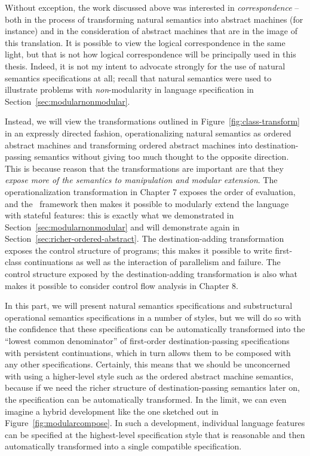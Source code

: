 Without exception, the work discussed above was interested in {\it
  correspondence} -- both in the process of transforming natural
semantics into abstract machines (for instance) and in the
consideration of abstract machines that are in the image of this
translation. It is possible to view the logical correspondence in the
same light, but that is not how logical correspondence will be
principally used in this thesis.  Indeed, it is not my intent to
advocate strongly for the use of natural semantics specifications at
all; recall that natural semantics were used to illustrate problems
with {\it non}-modularity in language specification in
Section~\ref{sec:modularnonmodular}. 

Instead, we will view the transformations outlined in
Figure~\ref{fig:class-transform} in an expressly directed fashion,
operationalizing natural semantics as ordered abstract machines and
transforming ordered abstract machines into destination-passing
semantics without giving too much thought to the opposite
direction. This is because reason that the transformations are
important are that they {\it expose more of the semantics to
  manipulation and modular extension}.  The operationalization
transformation in Chapter 7 exposes the order of evaluation, and the
\sls~framework then makes it possible to modularly extend the language
with stateful features: this is exactly what we demonstrated in
Section~\ref{sec:modularnonmodular} and will demonstrate again in
Section~\ref{sec:richer-ordered-abstract}.  The destination-adding
transformation exposes the control structure of programs; this makes
it possible to write first-class continuations as well as the
interaction of parallelism and failure.  The control structure exposed
by the destination-adding transformation is also what makes it
possible to consider control flow analysis in Chapter 8.

In this part, we will present natural semantics specifications and
substructural operational semantics specifications in a number of
styles, but we will do so with the confidence that these
specifications can be automatically transformed into the ``lowest
common denominator'' of first-order destination-passing specifications
with persistent continuations, which in turn allows them to be
composed with any other specifications. Certainly, this means that we
should be unconcerned with using a higher-level style such as the
ordered abstract machine semantics, because if we need the richer
structure of destination-passing semantics later on, the specification
can be automatically transformed. In the limit, we can even imagine a
hybrid development like the one sketched out in
Figure~\ref{fig:modularcompose}. In such a development, individual
language features can be specified at the highest-level specification
style that is reasonable and then automatically transformed into a
single compatible specification.



